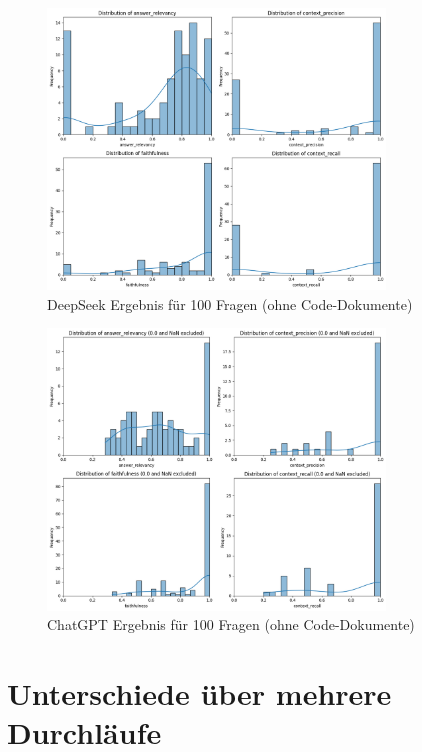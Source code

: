 \begin{figure}[!ht]
    \centering
    \includegraphics[width=0.8\textwidth]{images/20_4_D_D_distribution}
    \caption[DeepSeek Score Verteilung 100 Fragen]{DeepSeek Ergebnis für 100 Fragen (ohne Code-Dokumente)}
    \label{fig:deepseek_no_code}
\end{figure}

\begin{figure}[!ht]
    \centering
    \includegraphics[width=0.8\textwidth]{images/127_38_O_O_distribution}
    \caption[ChatGPT Score Verteilung 100 Fragen]{ChatGPT Ergebnis für 100 Fragen (ohne Code-Dokumente)}
    \label{fig:chatgpt_no_code}
\end{figure}

\section{Unterschiede über mehrere Durchläufe}\label{subsec:unterschiede-uber-mehrere-durchlaufe}

